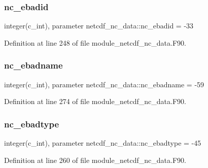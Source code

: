 \mbox{\label{namespacenetcdf__nc__data_ae3223e48ebe52d4714f345eb2e168789}} 
\subsubsection{\texorpdfstring{nc\+\_\+ebadid}{nc\_ebadid}}
{\footnotesize\ttfamily integer(c\+\_\+int), parameter netcdf\+\_\+nc\+\_\+data\+::nc\+\_\+ebadid = -\/33}



Definition at line 248 of file module\+\_\+netcdf\+\_\+nc\+\_\+data.\+F90.

\mbox{\label{namespacenetcdf__nc__data_a83da43e44429a69f612c4c22bc7b597f}} 
\subsubsection{\texorpdfstring{nc\+\_\+ebadname}{nc\_ebadname}}
{\footnotesize\ttfamily integer(c\+\_\+int), parameter netcdf\+\_\+nc\+\_\+data\+::nc\+\_\+ebadname = -\/59}



Definition at line 274 of file module\+\_\+netcdf\+\_\+nc\+\_\+data.\+F90.

\mbox{\label{namespacenetcdf__nc__data_a5f5ae403076d792021fd714a24bc2e7b}} 
\subsubsection{\texorpdfstring{nc\+\_\+ebadtype}{nc\_ebadtype}}
{\footnotesize\ttfamily integer(c\+\_\+int), parameter netcdf\+\_\+nc\+\_\+data\+::nc\+\_\+ebadtype = -\/45}



Definition at line 260 of file module\+\_\+netcdf\+\_\+nc\+\_\+data.\+F90.

